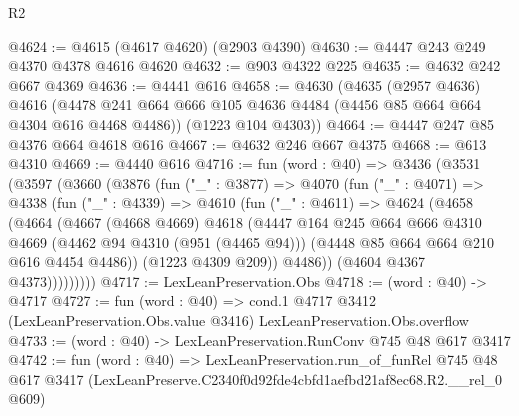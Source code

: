 \begin{lexlean}{R2}
\begin{coremodule}
@4624 := @4615 (@4617 @4620) (@2903 @4390)
@4630 := @4447 @243 @249 @4370 @4378 @4616 @4620
@4632 := @903 @4322 @225
@4635 := @4632 @242 @667 @4369
@4636 := @4441 @616
@4658 := @4630
    (@4635
      (@2957 @4636)
      @4616
      (@4478 @241 @664 @666 @105 @4636 @4484 (@4456 @85 @664 @664 @4304 @616 @4468 @4486))
      (@1223 @104 @4303))
@4664 := @4447 @247 @85 @4376 @664 @4618 @616
@4667 := @4632 @246 @667 @4375
@4668 := @613 @4310
@4669 := @4440 @616
@4716 := fun (word : @40) =>
  @3436
    (@3531
      (@3597
        (@3660
          (@3876
            (fun ("_" : @3877) =>
            @4070
              (fun ("_" : @4071) =>
              @4338
                (fun ("_" : @4339) =>
                @4610
                  (fun ("_" : @4611) =>
                  @4624
                    (@4658
                      (@4664
                        (@4667
                          (@4668 @4669)
                          @4618
                          (@4447
                            @164
                            @245
                            @664
                            @666
                            @4310
                            @4669
                            (@4462 @94 @4310 (@951 (@4465 @94)))
                            (@4448 @85 @664 @664 @210 @616 @4454 @4486))
                          (@1223 @4309 @209))
                        @4486))
                    (@4604 @4367 @4373)))))))))
@4717 := LexLeanPreservation.Obs
@4718 := (word : @40) -> @4717
@4727 := fun (word : @40) =>
  cond.{1} @4717 @3412 (LexLeanPreservation.Obs.value @3416) LexLeanPreservation.Obs.overflow
@4733 := (word : @40) -> LexLeanPreservation.RunConv @745 @48 @617 @3417
@4742 := fun (word : @40) =>
  LexLeanPreservation.run_of_funRel
    @745
    @48
    @617
    @3417
    (LexLeanPreserve.C2340f0d92fde4cbfd1aefbd21af8ec68.R2.__rel_0 @609)
\end{coremodule}
\end{lexlean}
